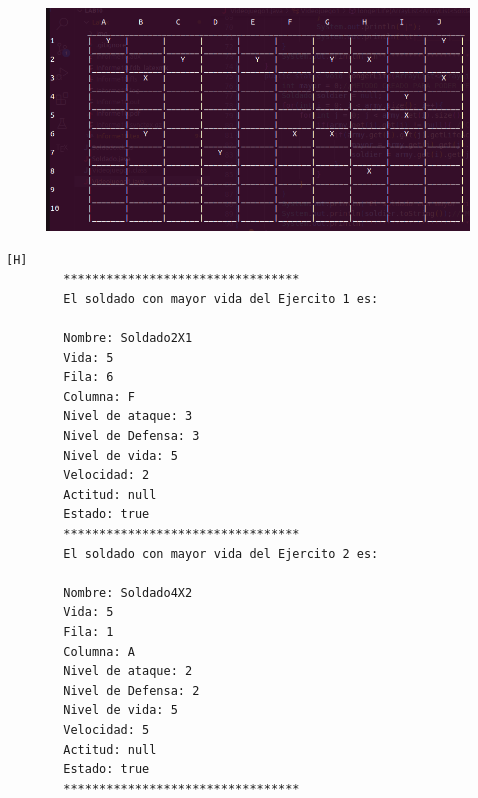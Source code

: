 \documentclass{article}
\begin{document}
	\begin{figure}[H]
		\centering
		\includegraphics[width=1.0\textwidth,keepaspectratio]{img/Commit4.png}
	\end{figure}
	\begin{lstlisting}[language=bash,caption={Ejecucion:}][H]
		*********************************
		El soldado con mayor vida del Ejercito 1 es: 
		
		Nombre: Soldado2X1
		Vida: 5
		Fila: 6
		Columna: F
		Nivel de ataque: 3
		Nivel de Defensa: 3
		Nivel de vida: 5
		Velocidad: 2
		Actitud: null
		Estado: true
		*********************************
		El soldado con mayor vida del Ejercito 2 es: 
		
		Nombre: Soldado4X2
		Vida: 5
		Fila: 1
		Columna: A
		Nivel de ataque: 2
		Nivel de Defensa: 2
		Nivel de vida: 5
		Velocidad: 5
		Actitud: null
		Estado: true
		*********************************
		
	\end{lstlisting}
\end{document}

